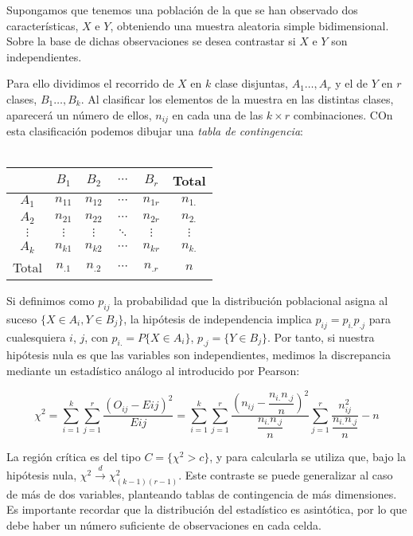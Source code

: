Supongamos que tenemos una poblaci\'on de la que se han observado dos caracter\'isticas, $X$ e $Y$, obteniendo una muestra aleatoria simple bidimensional. Sobre la base de dichas observaciones se desea contrastar si $X$ e $Y$ son independientes.

Para ello dividimos el recorrido de $X$ en $k$ clase disjuntas, $A_1\ldots,A_r$ y el de $Y$ en $r$ clases, $B_1\ldots,B_k$. Al clasificar los elementos de la muestra en las distintas clases, aparecer\'a un n\'umero de ellos, $n_{ij}$ en cada una de las $k\times r$ combinaciones. COn esta clasificaci\'on podemos dibujar una \textit{tabla de contingencia}:
\\
\\

\begin{tabular}{|c|cccc|c|}
\hline 
 & $B_1$ & $B_2$ & $\cdots$ & $B_r$ & Total \tabularnewline
\hline 
$A_1$ & $n_{11}$ & $n_{12}$ & $\cdots$ & $n_{1r}$ & $n_{1.}$ \tabularnewline
$A_2$ & $n_{21}$ & $n_{22}$ & $\cdots$ & $n_{2r}$ & $n_{2.}$ \tabularnewline
$\vdots$ & $\vdots$ & $\vdots$ & $\ddots$ & $\vdots$ & $\vdots$ \tabularnewline
$A_k$ & $n_{k1}$ & $n_{k2}$ & $\cdots$ & $n_{kr}$ & $n_{k.}$ \tabularnewline
\hline 
Total  & $n_{.1}$ & $n_{.2}$ & $\cdots$ & $n_{.r}$ & $n$ \tabularnewline
\hline 
\end{tabular}

Si definimos como $p_{ij}$ la probabilidad que la distribuci\'on poblacional asigna al suceso $\{X\in A_i, Y\in B_j\}$, la hip\'otesis de independencia implica $p_{ij}=p_{i.}p_{.j}$ para cualesquiera $i$, $j$, con $p_{i.}=P\{X\in A_i\}$, $p_{.j}=\{Y\in B_j\}$. Por tanto, si nuestra hip\'otesis nula es que las variables son independientes, medimos la discrepancia mediante un estad\'istico an\'alogo al introducido por Pearson:

\[\chi^2=\sum_{i=1}^k\sum_{j=1}^r\dfrac{\left(O_{ij}-E{ij}\right)^2}{E{ij}}=\sum_{i=1}^k\sum_{j=1}^r\dfrac{\left(n_{ij}-\dfrac{n_{i.}n_{.j}}{n}\right)^2}{\dfrac{n_{i.}n_{.j}}{n}}\sum_{j=1}^r\dfrac{n_{ij}^2}{\dfrac{n_{i.}n_{.j}}{n}}-n\]

La regi\'on cr\'itica es del tipo $C=\{\chi^2>c\}$, y para calcularla se utiliza que, bajo la hip\'otesis nula, $\chi^2\overset{d}{\to}\chi^2_{(k-1)(r-1)}$. Este contraste se puede generalizar al caso de m\'as de dos variables, planteando tablas de contingencia de m\'as dimensiones. Es importante recordar que la distribuci\'on del estad\'istico es asint\'otica, por lo que debe haber un n\'umero suficiente de observaciones en cada celda.

